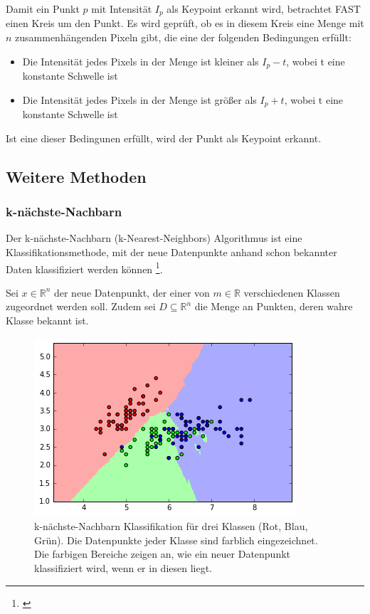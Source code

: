 Damit ein Punkt $p$ mit Intensität $I_p$ als Keypoint erkannt wird, betrachtet FAST einen Kreis um den Punkt. Es wird geprüft, ob es in diesem Kreis eine Menge mit $n$ zusammenhängenden Pixeln gibt, die eine der folgenden Bedingungen erfüllt:

\begin{itemize}
\item Die Intensität jedes Pixels in der Menge ist kleiner als $I_p - t$, wobei t eine konstante Schwelle ist
\item Die Intensität jedes Pixels in der Menge ist größer als $I_p + t$, wobei t eine konstante Schwelle ist
\end{itemize}

Ist eine dieser Bedingunen erfüllt, wird der Punkt als Keypoint erkannt.

\subsection{Weitere Methoden}

\subsubsection{k-nächste-Nachbarn}
\label{sub:knn}

Der k-nächste-Nachbarn (k-Nearest-Neighbors) Algorithmus ist eine Klassifikationsmethode, mit der neue Datenpunkte anhand schon bekannter Daten klassifiziert werden können \footnote{\cite{doi:10.1080/00031305.1992.10475879}}.

Sei $x \in \mathbb{R}^n$ der neue Datenpunkt, der einer von $m \in \mathbb{R}$ verschiedenen Klassen zugeordnet werden soll. Zudem sei $D \subseteq \mathbb{R}^n$ die Menge an Punkten, deren wahre Klasse bekannt ist.

\begin{figure}[h]
    \centering
		\includegraphics[scale=0.45]{bilder/knn.png}
    	\caption{k-nächste-Nachbarn Klassifikation für drei Klassen (Rot, Blau, Grün). Die Datenpunkte jeder Klasse sind farblich eingezeichnet. Die farbigen Bereiche zeigen an, wie ein neuer Datenpunkt klassifiziert wird, wenn er in diesen liegt.}
    	\label{fig:knn}
\end{figure}

